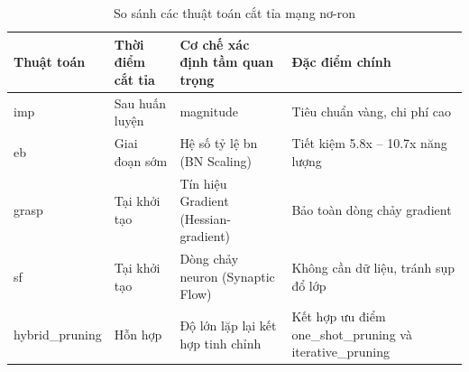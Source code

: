 \begin{table}[h]
\centering
\begin{tabularx}{\textwidth}{
|>{\centering\arraybackslash}m{2cm}
|>{\centering\arraybackslash}m{3cm}
|>{\centering\arraybackslash}m{4cm}
|>{\raggedright\arraybackslash}X|}
\hline
\textbf{Thuật toán} & \textbf{Thời điểm cắt tỉa} & \textbf{Cơ chế xác định tầm quan trọng} & \textbf{Đặc điểm chính} \\ \hline

\gls{imp} & Sau huấn luyện & \gls{magnitude} & Tiêu chuẩn vàng, chi phí cao \\ \hline

\gls{eb} & Giai đoạn sớm & Hệ số tỷ lệ \gls{bn} (BN Scaling) & Tiết kiệm 5.8x -- 10.7x năng lượng \cite{earlybird} \\ \hline

\gls{grasp} & Tại khởi tạo & Tín hiệu Gradient (Hessian-gradient) & Bảo toàn dòng chảy gradient \\ \hline

\gls{sf} & Tại khởi tạo & Dòng chảy neuron (Synaptic Flow) & Không cần dữ liệu, tránh sụp đổ lớp \\ \hline

\gls{hybrid_pruning} & Hỗn hợp & Độ lớn lặp lại kết hợp tinh chỉnh & Kết hợp ưu điểm \gls{one_shot_pruning} và \gls{iterative_pruning} \\ \hline
\end{tabularx}
\caption{So sánh các thuật toán cắt tỉa mạng nơ-ron}
\end{table}
